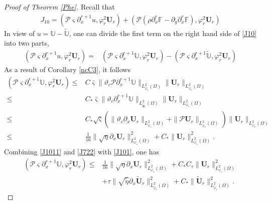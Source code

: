 \documentclass{amsart}
\numberwithin{equation}{section}
\begin{document}
\begin{proof}[Proof of Theorem \ref{Phe}]
Recall that
\begin{align}\label{J10}
J_{10}
= (\mathcal{P}\varsigma\partial_{x}^{r+1}u,\varphi_{r}^{2}\mathbf{U}_{r})
 +(\mathcal{P}(\rho\partial_{x}^{r}\mathbb{F}-\partial_{y}\partial_{x}^{r}\mathbb{F}),\varphi_{r}^{2}\mathbf{U}_{r})
\end{align}
In view of $u=\mathbb{U}-\tilde{\mathbb{U}}$, one can divide the first term on the right hand side of \eqref{J10} into two parts,
\begin{align}\label{J101}
(\mathcal{P}\varsigma\partial_{x}^{r+1}u,\varphi_{r}^{2}\mathbf{U}_{r})
=& (\mathcal{P}\varsigma\partial_{x}^{r+1}\mathbb{U},\varphi_{r}^{2}\mathbf{U}_{r})
  -(\mathcal{P}\varsigma\partial_{x}^{r+1}\tilde{\mathbb{U}},\varphi_{r}^{2}\mathbf{U}_{r})
\end{align}
As a result of Corollary \ref{ncC3}, it follows
\begin{align}\label{J1011}
(\mathcal{P}\varsigma\partial_{x}^{r+1}\mathbb{U},\varphi_{r}^{2}\mathbf{U}_{r})
\leq& C\bar{\varsigma}\|\vartheta_{c}\mathcal{P}\partial_{x}^{r+1}\mathbb{U}\|_{L_{\varphi_{r}}^{2}(\Omega)}
       \|\mathbf{U}_{r}\|_{L_{\varphi_{r}}^{2}(\Omega)}\\
\leq& C_{*}\bar{\varsigma}\|\vartheta_{c}\partial_{x}^{r+1}\mathbb{U}\|_{L_{\hat{\Psi}_{r}}^{2}(\Omega)}
       \|\mathbf{U}_{r}\|_{L_{\varphi_{r}}^{2}(\Omega)}\nonumber\\
\leq& C_{*}\sqrt{\bar{\varsigma}}
      \left(\|\vartheta_{c}\partial_{x}\mathbf{U}_{r}\|_{L_{\varphi_{r}}^{2}(\Omega)}
            +\|\mathcal{P}\mathbf{U}_{r}\|_{L_{\varphi_{r}}^{2}(\Omega)}\right)
      \|\mathbf{U}_{r}\|_{L_{\varphi_{r}}^{2}(\Omega)}\nonumber\\
\leq& \frac{1}{16}\|\sqrt{\eta}\partial_{x}\mathbf{U}_{r}\|_{L_{\varphi_{r}}^{2}(\Omega)}^{2}
     +C_{*}\|\mathbf{U}_{r}\|_{L_{\varphi_{r}}^{2}(\Omega)}^{2}.\nonumber
\end{align}
Combining \eqref{J1011} and \eqref{J722} with \eqref{J101}, one has
\begin{align}\label{J101'}
(\mathcal{P}\varsigma\partial_{x}^{r+1}\mathbb{U},\varphi_{r}^{2}\mathbf{U}_{r})
\leq& \frac{1}{16}\|\sqrt{\eta}\partial_{x}\mathbf{U}_{r}\|_{L_{\varphi_{r}}^{2}(\Omega)}^{2}
     +C_{*}C_{\tau}\|\mathbf{U}_{r}\|_{L_{\varphi_{r}}^{2}(\Omega)}^{2}\\
    &+\tau\|\sqrt{\tilde{\eta}}\partial_{x}\tilde{\mathbf{U}}_{r}\|_{L_{\tilde{\varphi}_{r}}^{2}(\Omega)}^{2}
     +C_{*}\|\tilde{\mathbf{U}}_{r}\|_{L_{\tilde{\varphi}_{r}}^{2}(\Omega)}^{2}.\nonumber
\end{align}


\end{proof}
\end{document}
